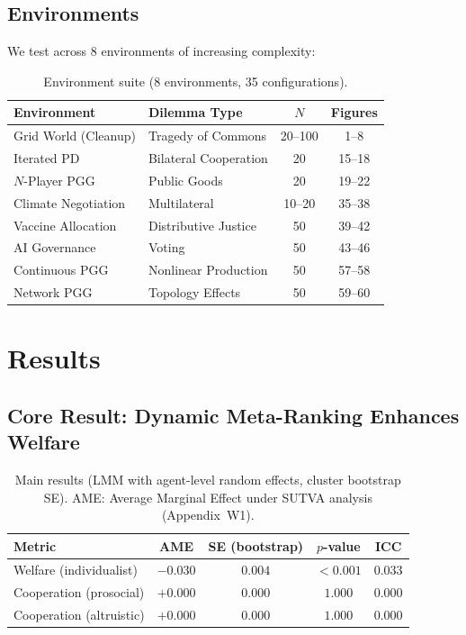 \documentclass{article}
\begin{document}
\subsection{Environments}

We test across 8 environments of increasing complexity:

\begin{table}[h]
\centering
\caption{Environment suite (8 environments, 35 configurations).}
\label{tab:envs}
\begin{tabular}{llcc}
\toprule
Environment & Dilemma Type & $N$ & Figures \\
\midrule
Grid World (Cleanup) & Tragedy of Commons & 20--100 & 1--8 \\
Iterated PD & Bilateral Cooperation & 20 & 15--18 \\
$N$-Player PGG & Public Goods & 20 & 19--22 \\
Climate Negotiation & Multilateral & 10--20 & 35--38 \\
Vaccine Allocation & Distributive Justice & 50 & 39--42 \\
AI Governance & Voting & 50 & 43--46 \\
Continuous PGG & Nonlinear Production & 50 & 57--58 \\
Network PGG & Topology Effects & 50 & 59--60 \\
\bottomrule
\end{tabular}
\end{table}

\section{Results}

\subsection{Core Result: Dynamic Meta-Ranking Enhances Welfare}

\begin{table}[h]
\centering
\caption{Main results (LMM with agent-level random effects, cluster bootstrap SE). AME: Average Marginal Effect under SUTVA analysis (Appendix~W1).}
\label{tab:main}
\begin{tabular}{lcccc}
\toprule
Metric & AME & SE (bootstrap) & $p$-value & ICC \\
\midrule
Welfare (individualist) & $-0.030$ & $0.004$ & $\mathbf{<0.001}$ & $0.033$ \\
Cooperation (prosocial) & $+0.000$ & $0.000$ & $1.000$ & $0.000$ \\
Cooperation (altruistic) & $+0.000$ & $0.000$ & $1.000$ & $0.000$ \\
\bottomrule
\end{tabular}
\end{table}
\end{document}
